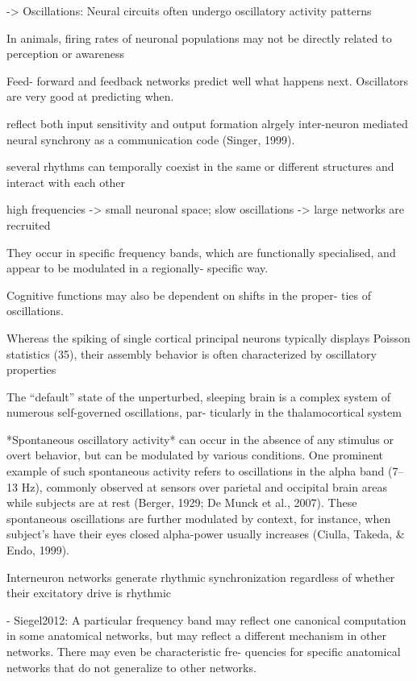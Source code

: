 \documentclass[authoryear,review,3p]{elsarticle}
\begin{document}
-> Oscillations:
Neural circuits often undergo oscillatory activity patterns

In animals, firing rates of neuronal populations may not be
directly related to perception or awareness

Feed- forward and feedback networks predict well what happens next. Oscillators are very good at predicting when.

reflect both input sensitivity and output formation
alrgely inter-neuron mediated
neural synchrony as a communication code (Singer, 1999).

several rhythms can temporally coexist in the same or different structures and interact with each other

high frequencies -> small neuronal space; slow oscillations -> large networks are recruited

They occur in specific frequency bands, which are functionally specialised, and appear to be modulated in a regionally- specific way.

Cognitive functions may also be dependent on shifts in the proper- ties of oscillations.

Whereas the spiking of single cortical principal neurons typically displays Poisson statistics (35), their assembly behavior is often characterized by oscillatory properties

The “default” state of the unperturbed, sleeping brain is a complex system of numerous self-governed oscillations, par- ticularly in the thalamocortical system

*Spontaneous oscillatory activity* can occur in the absence of any stimulus or overt behavior, but can be modulated by various conditions. One prominent example of such spontaneous activity refers to oscillations in the alpha band (7–13 Hz), commonly observed at sensors over parietal and occipital brain areas while subjects are at rest (Berger, 1929; De Munck et al., 2007). These spontaneous oscillations are further modulated by context, for instance, when subject’s have their eyes closed alpha-power usually increases (Ciulla, Takeda, & Endo, 1999).

Interneuron networks generate rhythmic synchronization regardless of whether their excitatory drive is rhythmic

- Siegel2012: A particular frequency band may reflect one canonical computation in some anatomical networks, but may reflect a different mechanism in other networks. There may even be characteristic fre- quencies for specific anatomical networks that do not generalize to other networks. 
\end{document}
